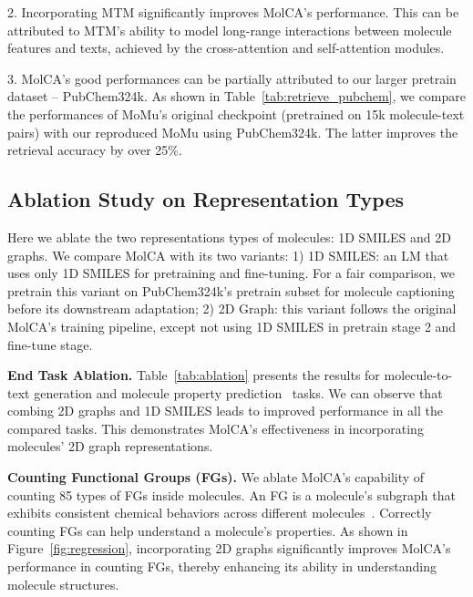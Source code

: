 \documentclass[11pt]{article}
\begin{document}
2. Incorporating MTM significantly improves MolCA's performance. This can be attributed to MTM's ability to model long-range interactions between molecule features and texts, achieved by the cross-attention and self-attention modules. 

3. MolCA's good performances can be partially attributed to our larger pretrain dataset -- PubChem324k. As shown in Table~\ref{tab:retrieve_pubchem}, we compare the performances of MoMu's original checkpoint (pretrained on 15k molecule-text pairs) with our reproduced MoMu using PubChem324k. The latter improves the retrieval accuracy by over 25\%. 


\subsection{Ablation Study on Representation Types}
Here we ablate the two representations types of molecules: 1D SMILES and 2D graphs. We compare MolCA with its two variants: 1) 1D SMILES: an LM that uses only 1D SMILES for pretraining and fine-tuning. For a fair comparison, we pretrain this variant on PubChem324k's pretrain subset for molecule captioning before its downstream adaptation; 2) 2D Graph: this variant follows the original MolCA's training pipeline, except not using 1D SMILES in pretrain stage 2 and fine-tune stage. 

\textbf{End Task Ablation.} Table~\ref{tab:ablation} presents the results for molecule-to-text generation and molecule property prediction~\cite{pretrain_gnn} tasks. We can observe that combing 2D graphs and 1D SMILES leads to improved performance in all the compared tasks. This demonstrates MolCA's effectiveness in incorporating molecules' 2D graph representations.


\textbf{Counting Functional Groups (FGs).} We ablate MolCA's capability of counting 85 types of FGs inside molecules. An FG is a molecule's subgraph that exhibits consistent chemical behaviors across different molecules~\cite{Grover}. Correctly counting FGs can help understand a molecule's properties. As shown in Figure~\ref{fig:regression}, incorporating 2D graphs significantly improves MolCA's performance in counting FGs, thereby enhancing its ability in understanding molecule structures.
\end{document}
